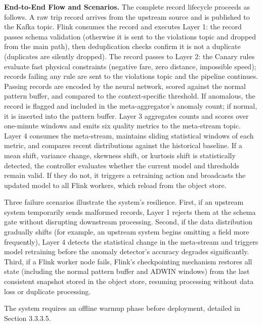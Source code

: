 \bigskip
\noindent\textbf{End-to-End Flow and Scenarios.} The complete record lifecycle proceeds as follows. A raw trip record arrives from the upstream source and is published to the Kafka topic. Flink consumes the record and executes Layer 1: the record passes schema validation (otherwise it is sent to the violations topic and dropped from the main path), then deduplication checks confirm it is not a duplicate (duplicates are silently dropped). The record passes to Layer 2: the Canary rules evaluate fast physical constraints (negative fare, zero distance, impossible speed); records failing any rule are sent to the violations topic and the pipeline continues. Passing records are encoded by the neural network, scored against the normal pattern buffer, and compared to the context-specific threshold. If anomalous, the record is flagged and included in the meta-aggregator's anomaly count; if normal, it is inserted into the pattern buffer. Layer 3 aggregates counts and scores over one-minute windows and emits six quality metrics to the meta-stream topic. Layer 4 consumes the meta-stream, maintains sliding statistical windows of each metric, and compares recent distributions against the historical baseline. If a mean shift, variance change, skewness shift, or kurtosis shift is statistically detected, the controller evaluates whether the current model and thresholds remain valid. If they do not, it triggers a retraining action and broadcasts the updated model to all Flink workers, which reload from the object store.

Three failure scenarios illustrate the system's resilience. First, if an upstream system temporarily sends malformed records, Layer 1 rejects them at the schema gate without disrupting downstream processing. Second, if the data distribution gradually shifts (for example, an upstream system begins omitting a field more frequently), Layer 4 detects the statistical change in the meta-stream and triggers model retraining before the anomaly detector's accuracy degrades significantly. Third, if a Flink worker node fails, Flink's checkpointing mechanism restores all state (including the normal pattern buffer and ADWIN windows) from the last consistent snapshot stored in the object store, resuming processing without data loss or duplicate processing.

The system requires an offline warmup phase before deployment, detailed in Section 3.3.3.5.

